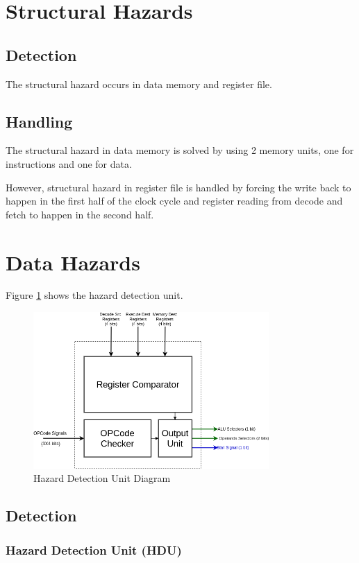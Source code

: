 \section{Structural Hazards}

\subsection{Detection}
The structural hazard occurs in data memory and register file.

\subsection{Handling}
The structural hazard in data memory is solved by using 2 memory units, one for instructions and one for data.

However, structural hazard in register file is handled by forcing the write back to happen in the first half of the clock cycle and register reading from decode and fetch to happen in the second half.

\section{Data Hazards}

Figure \ref{fig:hdu} shows the hazard detection unit.
\begin{figure}[hp]
    \centering
    \includegraphics[width=0.8\textwidth]{images/hdu}
    \caption{Hazard Detection Unit Diagram}
    \label{fig:hdu}
\end{figure}

\subsection{Detection}

\subsubsection{Hazard Detection Unit (HDU)}

